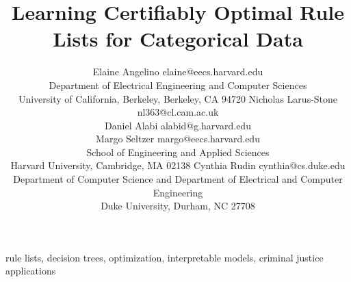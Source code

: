 \documentclass[twoside,11pt]{article}
\begin{document}
\title{Learning Certifiably Optimal Rule Lists for Categorical Data}

\author{\name Elaine Angelino \email elaine@eecs.harvard.edu \\
        \addr Department of Electrical Engineering and Computer Sciences\\
        University of California, Berkeley,
        Berkeley, CA 94720
        \AND
        \name Nicholas Larus-Stone \email nl363@cl.cam.ac.uk \\
        \name Daniel Alabi \email alabid@g.harvard.edu \\
        \name Margo Seltzer \email margo@eecs.harvard.edu \\
        \addr School of Engineering and Applied Sciences\\
        Harvard University,
        Cambridge, MA 02138
        \AND
        \name Cynthia Rudin \email cynthia@cs.duke.edu \\
        \addr Department of Computer Science and
        Department of Electrical and Computer Engineering\\
        Duke University,
        Durham, NC 27708}


\maketitle

\begin{abstract}%

\end{abstract}

\begin{keywords}
    rule lists, decision trees, optimization, interpretable models, criminal justice applications
\end{keywords}














\end{document}
